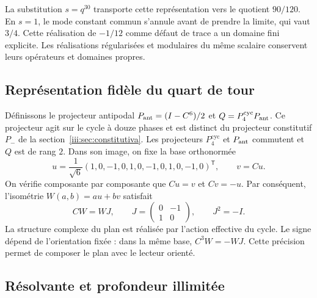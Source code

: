 La substitution $s=q^{30}$ transporte cette représentation vers le quotient
$90/120$. En $s=1$, le mode constant commun s’annule avant de prendre la
limite, qui vaut $3/4$. Cette réalisation de $-1/12$ comme défaut de trace
a un domaine fini explicite. Les réalisations régularisées et
modulaires du même scalaire conservent leurs opérateurs et domaines propres.

\subsection{Représentation fidèle du quart de tour}

Définissons le projecteur antipodal $P_{\rm ant}=(I-C^6)/2$ et
$Q=P_4^{\mathrm{cyc}}P_{\rm ant}$. Ce projecteur agit sur le cycle à douze phases et est
distinct du projecteur constitutif $P_-$ de la section~\ref{iii:sec:constitutiva}.
Les projecteurs $P_4^{\mathrm{cyc}}$ et $P_{\rm ant}$ commutent et
$Q$ est de rang $2$. Dans son image, on fixe la base orthonormée
\begin{equation}
 u=\frac1{\sqrt6}(1,0,-1,0,1,0,-1,0,1,0,-1,0)^{\mathsf T},
 \qquad v=Cu.
 \label{iii:eq:uv}
\end{equation}
On vérifie composante par composante que $Cu=v$ et $Cv=-u$. Par conséquent,
l’isométrie $W(a,b)=au+bv$ satisfait
\begin{equation}
 CW=WJ,\qquad
 J=\begin{pmatrix}0&-1\\1&0\end{pmatrix},\qquad J^2=-I.
 \label{iii:eq:quarter-intertwiner}
\end{equation}
La structure complexe du plan est réalisée par l’action effective du
cycle. Le signe dépend de l’orientation fixée : dans la même base,
$C^3W=-WJ$. Cette précision permet de composer le plan avec le lecteur orienté.

\subsection{Résolvante et profondeur illimitée}

